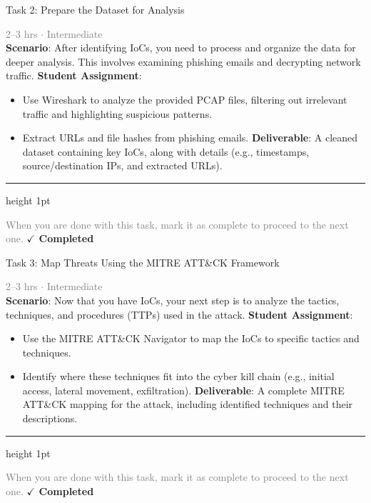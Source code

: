 \documentclass[10pt,a4paper]{article}
\begin{document}
\begin{taskbox}{Task 2: Prepare the Dataset for Analysis}

    {\small \textcolor{gray}{2--3 hrs $\cdot$ Intermediate}}\\[12pt]

    \textbf{Scenario}: After identifying IoCs, you need to process and organize the data for deeper analysis. This involves examining phishing emails and decrypting network traffic.  
\textbf{Student Assignment}:
\begin{itemize}
    \item Use Wireshark to analyze the provided PCAP files, filtering out irrelevant traffic and highlighting suspicious patterns.
    \item Extract URLs and file hashes from phishing emails.  
\textbf{Deliverable}: A cleaned dataset containing key IoCs, along with details (e.g., timestamps, source/destination IPs, and extracted URLs).\par
\end{itemize}

    \vspace{16pt}

    \textcolor{cardBorder}{\hrule height 1pt}\vspace{8pt}

    \small \textcolor{gray}{When you are done with this task, mark it as complete to proceed to the next one.} \hfill \textbf{\textcolor{brandDark}{$\checkmark$ Completed}}

\end{taskbox}

\begin{taskbox}{Task 3: Map Threats Using the MITRE ATT\&CK Framework}

    {\small \textcolor{gray}{2--3 hrs $\cdot$ Intermediate}}\\[12pt]

    \textbf{Scenario}: Now that you have IoCs, your next step is to analyze the tactics, techniques, and procedures (TTPs) used in the attack.  
\textbf{Student Assignment}:  
\begin{itemize}
    \item Use the MITRE ATT\&CK Navigator to map the IoCs to specific tactics and techniques.  
    \item Identify where these techniques fit into the cyber kill chain (e.g., initial access, lateral movement, exfiltration).  
\textbf{Deliverable}: A complete MITRE ATT\&CK mapping for the attack, including identified techniques and their descriptions.\par
\end{itemize}

    \vspace{16pt}

    \textcolor{cardBorder}{\hrule height 1pt}\vspace{8pt}

    \small \textcolor{gray}{When you are done with this task, mark it as complete to proceed to the next one.} \hfill \textbf{\textcolor{brandDark}{$\checkmark$ Completed}}

\end{taskbox}
\end{document}
